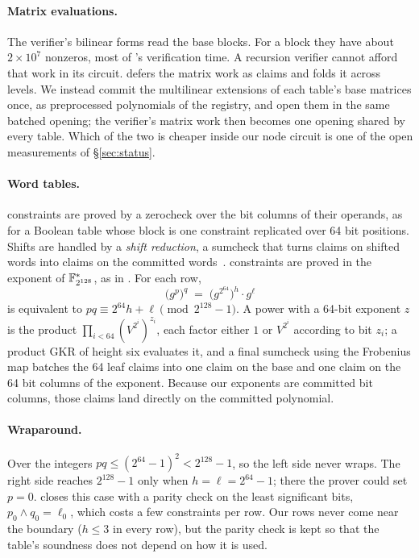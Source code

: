 \paragraph{Matrix evaluations.} The verifier's bilinear forms read the base blocks. For a \Blake{} block they have about $2\times 10^7$ nonzeros, most of \Flock{}'s verification time. A recursion verifier cannot afford that work in its circuit. \Flock{} defers the matrix work as claims and folds it across levels. We instead commit the multilinear extensions of each table's base matrices once, as preprocessed polynomials of the registry, and open them in the same batched \WHIR{} opening; the verifier's matrix work then becomes one opening shared by every table. Which of the two is cheaper inside our node circuit is one of the open measurements of \S\ref{sec:status}.

\paragraph{Word tables.} \AND{} constraints are proved by a zerocheck over the bit columns of their operands, as for a Boolean table whose block is one constraint replicated over 64 bit positions. Shifts are handled by a \emph{shift reduction}, a sumcheck that turns claims on shifted words into claims on the committed words~\citep{binius64}.
\MUL{} constraints are proved in the exponent of $\mathbb{F}_{2^{128}}^{*}$, as in \Binius{}. For each row,
\[
\big(g^{p}\big)^{q} \;=\; \big(g^{2^{64}}\big)^{h}\cdot g^{\ell}
\]
is equivalent to $p q \equiv 2^{64} h + \ell \pmod{2^{128}-1}$. A power with a 64-bit exponent $z$ is the product $\prod_{i<64} (V^{2^i})^{z_i}$, each factor either $1$ or $V^{2^i}$ according to bit $z_i$; a product GKR of height six evaluates it, and a final sumcheck using the Frobenius map batches the 64 leaf claims into one claim on the base and one claim on the 64 bit columns of the exponent. Because our exponents are committed bit columns, those claims land directly on the committed polynomial.

\paragraph{Wraparound.} Over the integers $p q \le (2^{64}-1)^2 < 2^{128}-1$, so the left side never wraps. The right side reaches $2^{128}-1$ only when $h = \ell = 2^{64}-1$; there the prover could set $p = 0$. \Binius{} closes this case with a parity check on the least significant bits, $p_0 \wedge q_0 = \ell_0$, which costs a few \AND{} constraints per row. Our \KB{} rows never come near the boundary ($h \le 3$ in every row), but the parity check is kept so that the table's soundness does not depend on how it is used.

